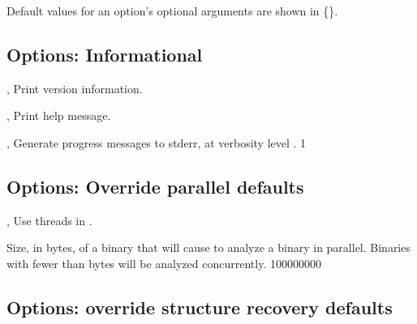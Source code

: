 \documentclass[english]{article}
\begin{document}
Default values for an option's optional arguments are shown in \{\}.

\subsection{Options: Informational}

\begin{Description}

\item[\Opt{-V}, \Opt{--version}]
Print version information.

\item[\Opt{-h}, \Opt{--help}]
Print help message.

\item[\OptArg{-v}{num}, \OptArg{--verbose}{num}]
Generate progress messages to stderr, at verbosity level . {1}

\end{Description}

\subsection{Options: Override parallel defaults}
\item[\OptArg{-j}{num}, \OptArg{--jobs}{num}]
Use  threads in .

\item[\OptArg{--psize}{n}]
Size, in bytes, of a binary that will cause 
to analyze a binary in parallel.
Binaries with fewer than  bytes will be analyzed
concurrently. {100000000}

\subsection{Options: override structure recovery defaults}
\end{document}
